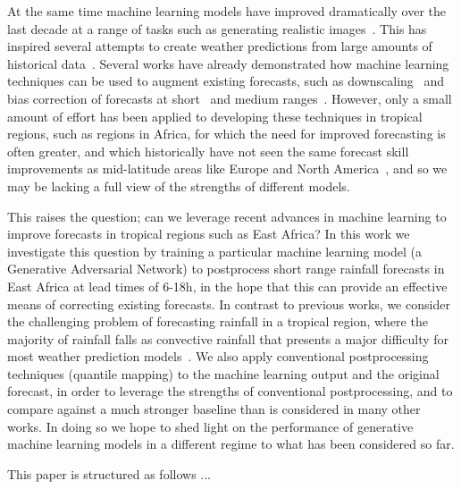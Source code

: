 \documentclass{article}
\begin{document}

At the same time machine learning models have improved dramatically over the last decade at a range of tasks such as generating realistic images~\citep{karras_style-based_2019}. This has inspired several attempts to create weather predictions from large amounts of historical data~\citep{nguyen_climax_2023, bi_pangu-weather_2022,ravuri_skilful_2021, zhang_skilful_2023,lam_graphcast_2022}. Several works have already demonstrated how machine learning techniques can be used to augment existing forecasts, such as downscaling~\citep{harris_generative_2022, leinonen_latent_2023} and bias correction of forecasts at short~\citep{rasp_neural_2018} and medium ranges~\citep{ben-bouallegue_improving_2023}. However, only a small amount of effort has been applied to developing these techniques in tropical regions, such as regions in Africa, for which the need for improved forecasting is often greater, and which historically have not seen the same forecast skill improvements as mid-latitude areas like Europe and North America~\citep{youds_gcrf_2021}, and so we may be lacking a full view of the strengths of different models.

This raises the question; can we leverage recent advances in machine learning to improve forecasts in tropical regions such as East Africa? In this work we investigate this question by training a particular machine learning model (a Generative Adversarial Network) to postprocess short range rainfall forecasts in East Africa at lead times of 6-18h, in the hope that this can provide an effective means of correcting existing forecasts. In contrast to previous works, we consider the challenging problem of forecasting rainfall in a tropical region, where the majority of rainfall falls as convective rainfall that presents a major difficulty for most weather prediction models~\citep{reynolds_wgne_2018}. We also apply conventional postprocessing techniques (quantile mapping) to the machine learning output and the original forecast, in order to leverage the strengths of conventional postprocessing, and to compare against a much stronger baseline than is considered in many other works. In doing so we hope to shed light on the performance of generative machine learning models in a different regime to what has been considered so far.

This paper is structured as follows ... 
\end{document}

